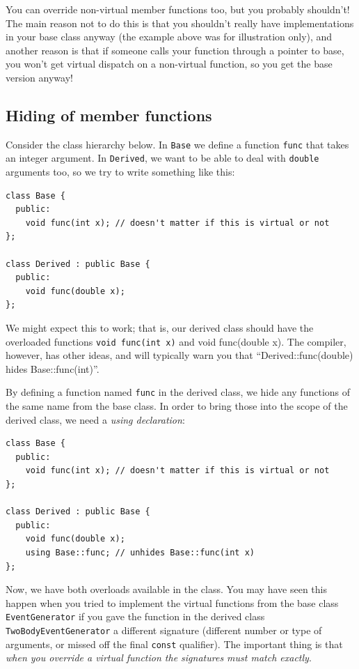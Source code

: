 \documentclass[a4paper]{scrartcl}
\begin{document}
You can override non-virtual member functions too, but you probably shouldn't! The main reason not to do this is that you shouldn't really have implementations in your base class anyway (the example above was for illustration only), and another reason is that if someone calls your function through a pointer to base, you won't get virtual dispatch on a non-virtual function, so you get the base version anyway!

\subsection{Hiding of member functions}
Consider the class hierarchy below. In \verb|Base| we define a function \verb|func| that takes an integer argument. In \verb|Derived|, we want to be able to deal with \verb|double| arguments too, so we try to write something like this:
\begin{verbatim}
class Base {
  public:
    void func(int x); // doesn't matter if this is virtual or not
};

class Derived : public Base {
  public:
    void func(double x);
};
\end{verbatim}

We might expect this to work; that is, our derived class should have the overloaded functions \texttt{void func(int x)} and {void func(double x)}. The compiler, however, has other ideas, and will typically warn you that ``Derived::func(double) hides Base::func(int)''.

By defining a function named \verb|func| in the derived class, we hide any functions of the same name from the base class. In order to bring those into the scope of the derived class, we need a \emph{using declaration}:
\begin{verbatim}
class Base {
  public:
    void func(int x); // doesn't matter if this is virtual or not
};

class Derived : public Base {
  public:
    void func(double x);
    using Base::func; // unhides Base::func(int x)
};
\end{verbatim}

Now, we have both overloads available in the class. You may have seen this happen when you tried to implement the virtual functions from the base class \verb|EventGenerator| if you gave the function in the derived class \verb|TwoBodyEventGenerator| a different signature (different number or type of arguments, or missed off the final \verb|const| qualifier). The important thing is that \emph{when you override a virtual function the signatures must match exactly}.
\end{document}
